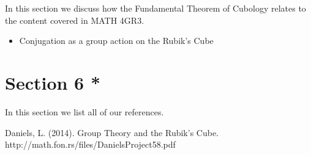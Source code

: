 In this section we discuss how the Fundamental Theorem of Cubology
relates to the content covered in MATH 4GR3.

\begin{itemize}
\tightlist
\item
  Conjugation as a group action on the Rubik's Cube
\end{itemize}

\section{Section 6 *}\label{section-6}

In this section we list all of our references.

Daniels, L. (2014). Group Theory and the Rubik's Cube.
http://math.fon.rs/files/DanielsProject58.pdf
